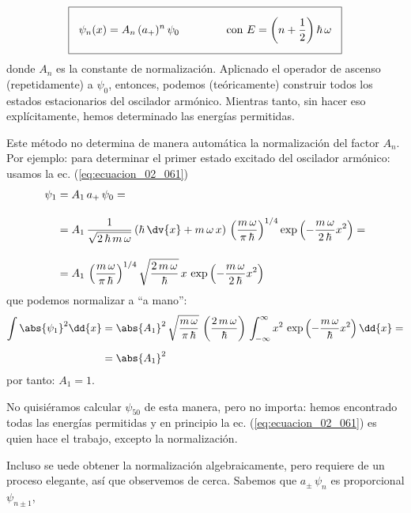 \begin{align}
\setlength{\fboxsep}{3\fboxsep}\boxed{ \psi_{n} (x) = A_{n} \, (a_{+})^{n} \, \psi_{0} \hspace{1.5cm} \mbox{con } E = \left( n + \dfrac{1}{2} \right) \hbar \, \omega}
\label{eq:ecuacion_02_061}
 \end{align}
donde $A_{n}$ es la constante de normalización. Aplicnado el operador de ascenso (repetidamente) a $\psi_{0}$, entonces, podemos (teóricamente) construir todos los estados estacionarios del oscilador armónico. Mientras tanto, sin hacer eso explícitamente, hemos determinado las energías permitidas.
\par
Este método no determina de manera automática la normalización del factor $A_{n}$. Por ejemplo: para determinar el primer estado excitado del oscilador armónico: usamos la ec. (\ref{eq:ecuacion_02_061})
\begin{align}
\begin{aligned}[b]
\psi_{1} &= A_{1} \, a_{+} \, \psi_{0} = \\[1em]
&= A_{1} \, \dfrac{1}{\sqrt{2 \, \hbar \, m \, \omega}} \left( \hbar \, \dv{x} + m \, \omega \, x \right) \, \left( \dfrac{m \, \omega}{\pi \, \hbar} \right)^{1/4} \exp \left( - \dfrac{m \, \omega}{2 \, \hbar} x^{2} \right) = \\[1em]
&= A_{1} \, \left( \dfrac{m \, \omega}{\pi \, \hbar} \right)^{1/4} \sqrt{\dfrac{2 \, m \, \omega}{\hbar}} \, x \, \exp \left( - \dfrac{m \, \omega}{2 \, \hbar} x^{2} \right)
\end{aligned}
\label{eq:ecuacion_02_062}
\end{align}
que podemos normalizar a \enquote{a mano}:
\begin{align*}
\int \abs{\psi_{1}}^{2} \dd{x} &= \abs{A_{1}}^{2} \, \sqrt{ \dfrac{m \, \omega}{\pi \, \hbar}} \, \left( \dfrac{2 \, m \, \omega}{\hbar} \right) \,\int_{-\infty}^{\infty} x^{2} \, \exp \left( - \dfrac{m \, \omega}{\hbar} x^{2} \right) \dd{x} = \\[0.5em]
&= \abs{A_{1}}^{2}
\end{align*}
por tanto: $A_{1} = 1$.
\par
No quisiéramos calcular $\psi_{50}$ de esta manera, pero no importa: hemos encontrado todas las energías permitidas y en principio la ec. (\ref{eq:ecuacion_02_061}) es quien hace el trabajo, excepto la normalización.
\par
Incluso se uede obtener la normalización algebraicamente, pero requiere de un proceso elegante, así que observemos de cerca. Sabemos que $a_{\pm} \, \psi_{n}$ es proporcional $\psi_{n \pm 1}$,
